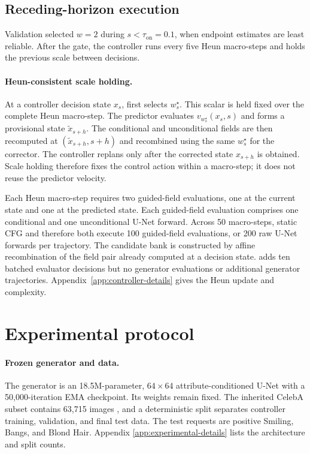 \documentclass[10pt,twocolumn,letterpaper]{article}
\begin{document}
\subsection{Receding-horizon execution}

Validation selected $w=2$ during $s<\tau_{\mathrm{on}}=0.1$, when endpoint
estimates are least reliable. After the gate, the controller runs every five
Heun macro-steps and holds the previous scale between decisions.

\paragraph{Heun-consistent scale holding.}
At a controller decision state $x_s$, \method first selects $w_s^\star$. This
scalar is held fixed over the complete Heun macro-step. The predictor evaluates
$v_{w_s^\star}(x_s,s)$ and forms a provisional state $\tilde{x}_{s+h}$. The
conditional and unconditional fields are then recomputed at
$(\tilde{x}_{s+h},s+h)$ and recombined using the same $w_s^\star$ for the
corrector. The controller replans only after the corrected state $x_{s+h}$ is
obtained. Scale holding therefore fixes the control action within a macro-step;
it does not reuse the predictor velocity.

Each Heun macro-step requires two guided-field evaluations, one at the current
state and one at the predicted state. Each guided-field evaluation comprises
one conditional and one unconditional U-Net forward. Across 50 macro-steps,
static CFG and \method therefore both execute 100 guided-field evaluations, or
200 raw U-Net forwards per trajectory. The candidate bank is constructed by
affine recombination of the field pair already computed at a decision state.
\method adds ten batched evaluator decisions but no generator evaluations or
additional generator trajectories. Appendix~\ref{app:controller-details} gives
the Heun update and complexity.

\section{Experimental protocol}
\label{sec:experiments}

\paragraph{Frozen generator and data.}
The generator is an 18.5M-parameter, $64\times64$ attribute-conditioned U-Net
with a 50,000-iteration EMA checkpoint. Its weights remain fixed. The inherited
CelebA subset contains 63,715 images \cite{liu2015celeba}, and a deterministic
split separates controller training, validation, and final test data. The test
requests are positive Smiling, Bangs, and Blond Hair. Appendix
\ref{app:experimental-details} lists the architecture and split counts.
\end{document}
